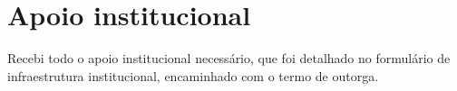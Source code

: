 \section{Apoio institucional} %
Recebi todo o apoio institucional necessário, que foi detalhado no formulário de infraestrutura institucional, 
encaminhado com o termo de outorga. 
